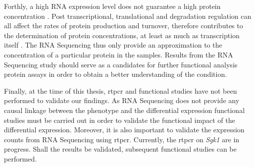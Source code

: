 Forthly, a high RNA expression level does not guarantee a high protein concentration \citep{Vogel2012}.
Post transcriptional, translational and degradation regulation can all affect the rates of protein production and turnover, therefore contributes to the determination of protein concentrations, at least as much as transcription itself \citep{Vogel2012}.
The RNA Sequencing thus only provide an approximation to the concentration of a particular protein in the samples.
Results from the RNA Sequencing study should serve as a candidates for further functional analysis protein assays in order to obtain a better understanding of the condition.

Finally, at the time of this thesis, \gls{rtpcr} and functional studies have not been performed to  validate our findings.
As RNA Sequencing does not provide any causal linkage between the phenotype and the differential expression functional studies must be carried out in order to validate the functional impact of the differential expression. 
Moreover, it is also important to validate the expression counts from RNA Sequencing using \gls{rtpcr}.
Currently, the \gls{rtpcr} on \textit{Sgk1} are in progress. 
Shall the results be validated, subsequent functional studies can be performed. 

\newpage
